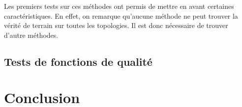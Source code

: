Les premiers tests sur ces méthodes ont permis de mettre en avant certaines caractéristiques.
En effet, on remarque qu'aucune méthode ne peut trouver  la vérité de terrain sur toutes les topologies.
Il est donc nécessaire de trouver d'autre méthodes.









\subsection{Tests de fonctions de qualité}

\section{Conclusion}
